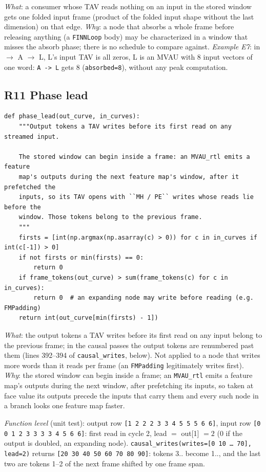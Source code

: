 \documentclass[10pt,a4paper]{article}
\newcommand{\code}[1]{\texttt{#1}}
\begin{document}
\emph{What}: a consumer whose TAV reads nothing on an input in the stored window
gets one folded input frame (product of the folded input shape without the last
dimension) on that edge. \emph{Why}: a node that absorbs a whole frame before releasing
anything (a \code{FINNLoop} body) may be characterized in a window that misses the
absorb phase; there is no schedule to compare against. \emph{Example E7}: in $\to$ A $\to$ L,
L's input TAV is all zeros, L is an MVAU with 8 input vectors of one word: \code{A -> L}
gets 8 (\code{absorbed=8}), without any peak computation.

\subsection{R11 Phase lead}\label{sec:lead}

\begin{lstlisting}[firstnumber=354,title={\texttt{src/finn/transformation/fpgadataflow/derive\_characteristic.py}, lines 354--367}]
def phase_lead(out_curve, in_curves):
    """Output tokens a TAV writes before its first read on any streamed input.

    The stored window can begin inside a frame: an MVAU_rtl emits a feature
    map's outputs during the next feature map's window, after it prefetched the
    inputs, so its TAV opens with ``MH / PE`` writes whose reads lie before the
    window. Those tokens belong to the previous frame.
    """
    firsts = [int(np.argmax(np.asarray(c) > 0)) for c in in_curves if int(c[-1]) > 0]
    if not firsts or min(firsts) == 0:
        return 0
    if frame_tokens(out_curve) > sum(frame_tokens(c) for c in in_curves):
        return 0  # an expanding node may write before reading (e.g. FMPadding)
    return int(out_curve[min(firsts) - 1])
\end{lstlisting}

\emph{What}: the output tokens a TAV writes before its first read on any input
belong to the previous frame; in the causal passes the output tokens are renumbered
past them (lines 392--394 of \code{causal\_writes}, below). Not applied to a node that writes
more words than it reads per frame (an \code{FMPadding} legitimately writes first).
\emph{Why}: the stored window can begin inside a frame; an \code{MVAU\_rtl} emits
a feature map's outputs during the next window, after prefetching its inputs, so taken
at face value its outputs precede the inputs that carry them and every such node in a
branch looks one feature map faster.

\emph{Function level} (unit test): output row \code{[1 2 2 2 3 3 4 5 5 5 6 6]}, input row
\code{[0 0 1 2 3 3 3 3 4 5 6 6]}: first read in cycle 2, lead $=$ out[1] $=2$
(0 if the output is doubled, an expanding node). \code{causal\_writes(writes=[0 10
\dots\ 70], lead=2)} returns \code{[20 30 40 50 60 70 80 90]}: tokens 3.. become
1.., and the last two are tokens 1--2 of the next frame shifted by one frame span.
\end{document}
